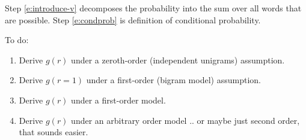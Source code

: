 \documentclass[11pt,letterpaper]{article}
\theoremstyle{definition}
\begin{document}
Step \ref{e:introduce-v} decomposes the probability into the sum over all words that are possible.  Step \ref{e:condprob} is definition of conditional probability.

To do:
\begin{enumerate}
\item Derive $g(r)$ under a zeroth-order (independent unigrams) assumption.
\item Derive $g(r=1)$ under a first-order (bigram model) assumption.
\item Derive $g(r)$ under a first-order model.
\item Derive $g(r)$ under an arbitrary order model .. or maybe just second order, that sounds easier.
\end{enumerate}


% 
% 
\end{document}
